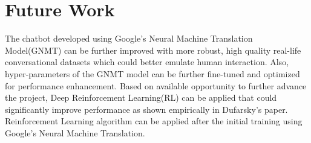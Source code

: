 \documentclass[a4paper,12pt]{report}
\begin{document}
{\let\clearpage\relax \chapter {Future Work}}
\noindent The chatbot developed using Google's Neural Machine Translation Model(GNMT) can be further improved with more robust, high quality real-life conversational datasets which could better emulate human interaction. Also, hyper-parameters of the GNMT model can be further fine-tuned and optimized for performance enhancement. Based on available opportunity to further advance the project, Deep Reinforcement Learning(RL) can be applied that could significantly improve performance as shown empirically in Dufarsky's paper. Reinforcement Learning algorithm can be applied after the initial training using Google's Neural Machine Translation.\\\\
\end{document}
